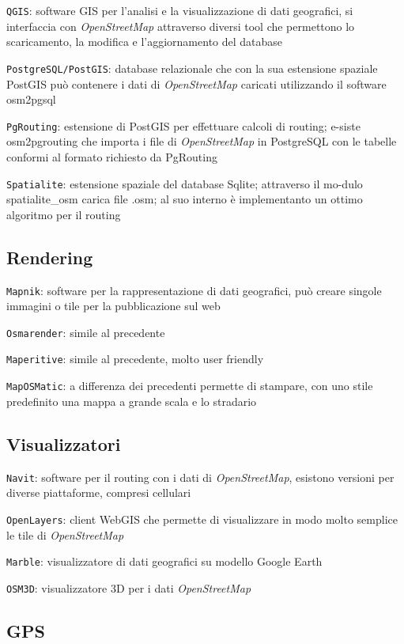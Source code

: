 \documentclass[a4paper,twoside,12pt,]{article}
\newcommand{\osm}{\emph{OpenStreetMap}\xspace}
\newcommand{\soft}[1]{\texttt{#1}}
\begin{document}
\soft{QGIS}: software GIS per l'analisi e la visualizzazione di dati geografici, si interfaccia con \osm attraverso diversi tool che permettono lo scaricamento, la modifica e l'aggiornamento del database

\soft{PostgreSQL/PostGIS}: database relazionale che con la sua estensione spaziale PostGIS può contenere i dati di \osm caricati utilizzando il software osm2pgsql

\soft{PgRouting}: estensione di PostGIS per effettuare calcoli di routing; e-siste osm2pgrouting che importa i file di \osm in PostgreSQL con le tabelle conformi al formato richiesto da PgRouting

\soft{Spatialite}: estensione spaziale del database Sqlite; attraverso il mo-dulo spatialite\_osm carica file .osm; al suo interno è implementanto un ottimo algoritmo per il routing 

\subsection{Rendering}

\soft{Mapnik}: software per la rappresentazione di dati geografici, può creare singole immagini o tile per la pubblicazione sul web

\soft{Osmarender}: simile al precedente

\soft{Maperitive}: simile al precedente, molto user friendly

\soft{MapOSMatic}: a differenza dei precedenti permette di stampare, con uno stile predefinito una mappa a grande scala e lo stradario

\subsection{Visualizzatori}

\soft{Navit}: software per il routing con i dati di \osm, esistono versioni per diverse piattaforme, compresi cellulari

\soft{OpenLayers}: client WebGIS che permette di visualizzare in modo molto semplice le tile di \osm

\soft{Marble}: visualizzatore di dati geografici su modello Google Earth

\soft{OSM3D}: visualizzatore 3D per i dati \osm

\subsection{GPS}
\end{document}
